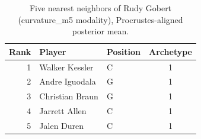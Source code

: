 \begin{table}[htbp]
  \centering\small
  \begin{tabular}{rllc}
    \toprule
    Rank & Player & Position & Archetype \\
    \midrule
    1 & Walker Kessler & C & 1 \\
    2 & Andre Iguodala & G & 1 \\
    3 & Christian Braun & G & 1 \\
    4 & Jarrett Allen & C & 1 \\
    5 & Jalen Duren & C & 1 \\
    \bottomrule
  \end{tabular}
  \caption{Five nearest neighbors of Rudy Gobert (curvature_m5 modality), Procrustes-aligned posterior mean.}
  \label{tab:Rudy_Gobert_neighbors_curvature_m5}
\end{table}

